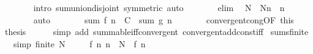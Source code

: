 \begin{isabellebody}
\ \ \ \ \ \ \isamarkupfalse%
\ {\isacharparenleft}{\kern0pt}intro\ sum{\isachardot}{\kern0pt}union{\isacharunderscore}{\kern0pt}disjoint\ {\isacharbrackleft}{\kern0pt}symmetric{\isacharbrackright}{\kern0pt}{\isacharparenright}{\kern0pt}\ auto\isanewline
\ \ \ \ \isamarkupfalse%
\ \isamarkupfalse%
\ elim\ \isamarkupfalse%
\ {\isachardoublequoteopen}{\isacharbraceleft}{\kern0pt}{\isachardot}{\kern0pt}{\isachardot}{\kern0pt}{\isacharless}{\kern0pt}N{\isacharbraceright}{\kern0pt}\ {\isasymunion}\ {\isacharbraceleft}{\kern0pt}N{\isachardot}{\kern0pt}{\isachardot}{\kern0pt}{\isacharless}{\kern0pt}n{\isacharbraceright}{\kern0pt}\ {\isacharequal}{\kern0pt}\ {\isacharbraceleft}{\kern0pt}{\isachardot}{\kern0pt}{\isachardot}{\kern0pt}{\isacharless}{\kern0pt}n{\isacharbraceright}{\kern0pt}{\isachardoublequoteclose}\isanewline
\ \ \ \ \ \ \isamarkupfalse%
\ auto\isanewline
\ \ \ \ \isamarkupfalse%
\ \isamarkupfalse%
\ {\isachardoublequoteopen}sum\ f\ {\isacharbraceleft}{\kern0pt}{\isachardot}{\kern0pt}{\isachardot}{\kern0pt}{\isacharless}{\kern0pt}n{\isacharbraceright}{\kern0pt}\ {\isacharequal}{\kern0pt}\ C\ {\isacharplus}{\kern0pt}\ sum\ g\ {\isacharbraceleft}{\kern0pt}{\isachardot}{\kern0pt}{\isachardot}{\kern0pt}{\isacharless}{\kern0pt}n{\isacharbraceright}{\kern0pt}{\isachardoublequoteclose}\ \isacommand{{\isachardot}{\kern0pt}}\isamarkupfalse%
\isanewline
\ \ \isamarkupfalse%
\isanewline
\ \ \isamarkupfalse%
\ convergent{\isacharunderscore}{\kern0pt}cong{\isacharbrackleft}{\kern0pt}OF\ this{\isacharbrackright}{\kern0pt}\ \isamarkupfalse%
\ {\isacharquery}{\kern0pt}thesis\isanewline
\ \ \ \ \isamarkupfalse%
\ {\isacharparenleft}{\kern0pt}simp\ add{\isacharcolon}{\kern0pt}\ summable{\isacharunderscore}{\kern0pt}iff{\isacharunderscore}{\kern0pt}convergent\ convergent{\isacharunderscore}{\kern0pt}add{\isacharunderscore}{\kern0pt}const{\isacharunderscore}{\kern0pt}iff{\isacharparenright}{\kern0pt}\isanewline
{}\isamarkupfalse%
%
\endisatagproof
{\isafoldproof}%
%
\isadelimproof
\isanewline
%
\endisadelimproof
\isanewline
{}\isamarkupfalse%
\ sums{\isacharunderscore}{\kern0pt}finite{\isacharcolon}{\kern0pt}\isanewline
\ \ \ {\isacharbrackleft}{\kern0pt}simp{\isacharbrackright}{\kern0pt}{\isacharcolon}{\kern0pt}\ {\isachardoublequoteopen}finite\ N{\isachardoublequoteclose}\isanewline
\ \ \ \ \ f{\isacharcolon}{\kern0pt}\ {\isachardoublequoteopen}{\isasymAnd}n{\isachardot}{\kern0pt}\ n\ {\isasymnotin}\ N\ {\isasymLongrightarrow}\ f\ n\ {\isacharequal}{\kern0pt}\ {}{\isachardoublequoteclose}\isanewline

\end{isabellebody}
